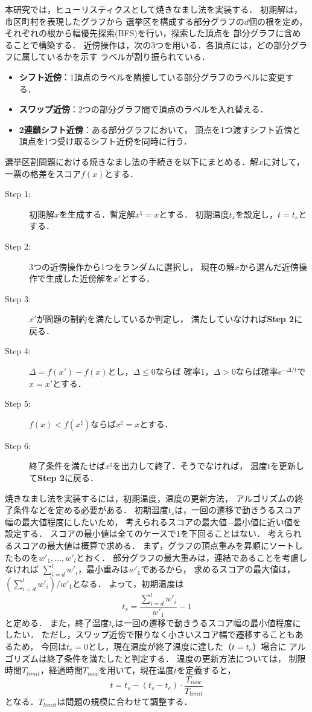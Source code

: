 \documentclass[10pt,a4paper,notitlepage,oneside,twocolumn]{abst_jsarticle}
\begin{document}
本研究では，ヒューリスティクスとして焼きなまし法を実装する．
初期解は，市区町村を表現したグラフから
選挙区を構成する部分グラフの$d$個の根を定め，
それぞれの根から幅優先探索(BFS)を行い，探索した頂点を
部分グラフに含めることで構築する．
近傍操作は，次の3つを用いる．各頂点には，どの部分グラフに属しているかを示す
ラベルが割り振られている．
\begin{itemize}
  \item \textbf{シフト近傍}：1頂点のラベルを隣接している部分グラフのラベルに変更する．
  \item \textbf{スワップ近傍}：2つの部分グラフ間で頂点のラベルを入れ替える．
  \item \textbf{2連鎖シフト近傍}：ある部分グラフにおいて，
  頂点を1つ渡すシフト近傍と頂点を1つ受け取るシフト近傍を同時に行う．
\end{itemize}

選挙区割問題における焼きなまし法の手続きを以下にまとめる．解$x$に対して，一票の格差をスコア$f(x)$とする．

\begin{description}
  \item[Step 1:] 初期解$x$を生成する．暫定解$x^{\natural}=x$とする．
  初期温度$t_s$を設定し，$t=t_s$とする．
  \item[Step 2:] 3つの近傍操作から1つをランダムに選択し，
  現在の解$x$から選んだ近傍操作で生成した近傍解を$x'$とする．
  \item[Step 3:] $x'$が問題の制約を満たしているか判定し，
  満たしていなければ\textbf{Step 2}に戻る．
  \item[Step 4:] $\Delta=f(x')-f(x)$とし，$\Delta \leq 0$ならば
  確率$1$，$\Delta > 0$ならば確率$e^{-\Delta/t}$で$x=x'$とする．
  \item[Step 5:] $f(x)<f(x^{\natural})$ならば$x^{\natural}=x$とする．
  \item[Step 6:] 終了条件を満たせば$x^{\natural}$を出力して終了．そうでなければ，
  温度$t$を更新して\textbf{Step 2}に戻る．
\end{description}

焼きなまし法を実装するには，初期温度，温度の更新方法，
アルゴリズムの終了条件などを定める必要がある．
初期温度$t_{s}$は，一回の遷移で動きうるスコア幅の最大値程度にしたいため，
考えられるスコアの最大値$-$最小値に近い値を設定する．
スコアの最小値は全てのケースで$1$を下回ることはない．
考えられるスコアの最大値は概算で求める．
まず，グラフの頂点重みを昇順にソートしたものを$w'_1,\ldots,w'_l$とおく．
部分グラフの最大重みは，連結であることを考慮しなければ
$\sum_{i=d}^l w'_i$，最小重みは$w'_1$であるから，
求めるスコアの最大値は，$(\sum_{i=d}^l w'_i)/w'_1$となる．
よって，初期温度は$$t_s=\frac{\sum_{i=d}^l w'_i}{w'_1}- 1$$と定める．
また，終了温度$t_e$は一回の遷移で動きうるスコア幅の最小値程度にしたい．
ただし，スワップ近傍で限りなく小さいスコア幅で遷移することもあるため，
今回は$t_e=0$とし，現在温度が終了温度に達した（$t=t_e$）場合に
アルゴリズムは終了条件を満たしたと判定する．
温度の更新方法については，
制限時間$T_{limit}$，経過時間$T_{now}$を用いて，現在温度$t$を定義すると，
$$t=t_s - (t_s - t_e)\cdot \frac{T_{now}}{T_{limit}}$$
となる．$T_{limit}$は問題の規模に合わせて調整する．
\end{document}
